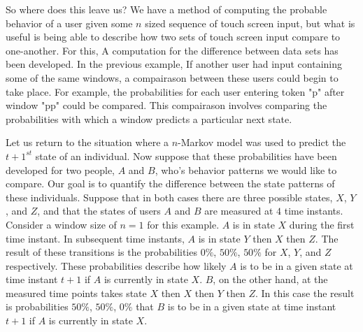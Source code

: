 So where does this leave us?
We have a method of computing the
probable behavior of a user given 
some $n$ sized sequence of touch screen input,
but what is useful is being able to describe
how two sets of touch screen input compare to one-another.
For this,
A computation for the difference between data sets has been developed.
%
In the previous example,
If another user had input containing 
some of the same windows,
a compairason between these users could begin to take place.
%
For example,
the probabilities for each user
entering token "p" after window "pp"
could be compared.
%
This compairason involves comparing
the probabilities with which 
a window predicts a particular next state.

Let us return to the situation where
a $n$-Markov model was used to predict the $t+1^{st}$ state
of an individual.
Now suppose that these probabilities have been developed for
two people, $A$ and $B$, who's behavior patterns we would like to
compare.
Our goal is to quantify the difference between
the state patterns of these individuals.
Suppose that in both cases there are three possible states,
$X$, $Y$, and $Z$, and
that the states of users $A$ and $B$ are measured at $4$ time instants.
Consider a window size of $n=1$ for this example.
%
$A$ is in state $X$ during the first time instant.
In subsequent time instants,
$A$ is in state $Y$ then $X$ then $Z$.
The result of these transitions is 
the probabilities $0\%$, $50\%$, $50\%$
for $X$, $Y$, and $Z$ respectively.
%
These probabilities describe how likely
$A$ is to be in a given state at time instant $t+1$
if $A$ is currently in state $X$.
%
$B$, on the other hand,
at the measured time points takes state
$X$ then $X$ then $Y$ then $Z$.
In this case the
result is probabilities $50\%$, $50\%$, $0\%$ 
that $B$ is to be in a given state at time instant $t+1$
if $A$ is currently in state $X$.
%

